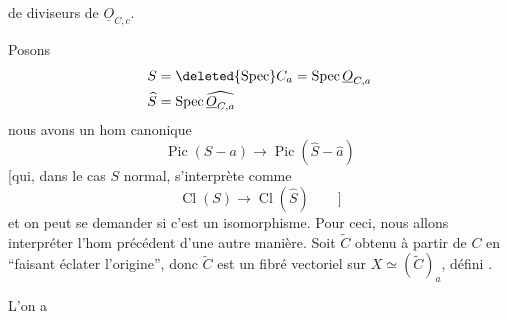 de diviseurs de $\underline O_{C,c}$.

Posons
\[
\begin{aligned}
S&=\deleted{\operatorname{Spec}}C_a=\operatorname{Spec}\underline O_{C,a}\\
\widehat S&=\operatorname{Spec}\widehat{\underline O_{C,a}}
\end{aligned}
\]
nous avons un hom canonique
\[
\operatorname{Pic}(S-a)\longrightarrow\operatorname{Pic}(\widehat S-\hat a)
\]
[qui, dans le cas $S$ normal, s'interprète comme
\[
\operatorname{Cl}(S)\longrightarrow\operatorname{Cl}(\widehat S)\qquad ]
\]
et on peut se demander si c'est un isomorphisme.  Pour ceci, nous allons interpréter l'hom précédent d'une autre manière. Soit $\widetilde C$ obtenu à partir de $C$ en ``faisant éclater l'origine'', donc $\widetilde C$ est un fibré vectoriel sur $X\simeq(\widetilde C)_a$, défini  .

L'on a 
